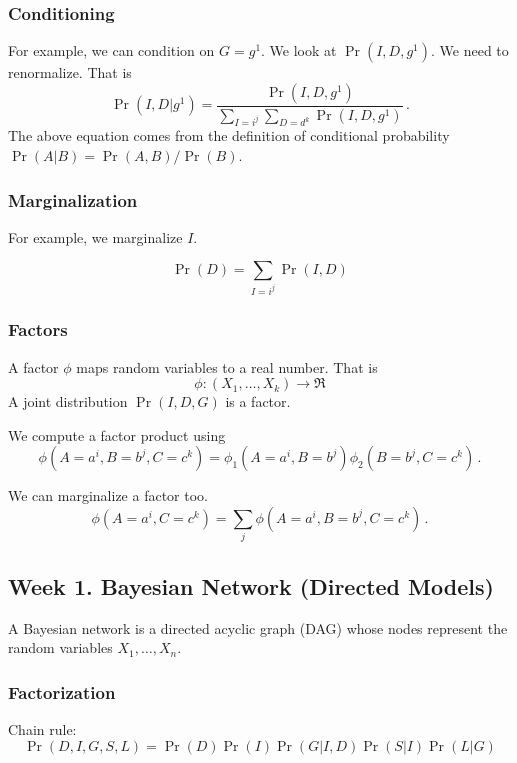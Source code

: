 \documentclass[12pt]{article}
\begin{document}
\subsubsection{Conditioning}
For example, we can condition on $G=g^1$.  We look at $\Pr(I, D, g^1)$.
We need to renormalize. That is
\begin{equation*}
  \Pr(I, D | g^1) = \frac{\Pr(I, D, g^1)}
                         {\sum_{I=i^j} \sum_{D=d^k} \Pr(I, D, g^1)}  \, .
\end{equation*}
The above equation comes from the definition of conditional probability $\Pr(A | B) = \Pr(A, B) / \Pr(B)$.

\subsubsection{Marginalization}
For example, we marginalize $I$.

\begin{equation*}
  \Pr(D) = \sum_{I=i^j} \Pr(I, D)
\end{equation*}


\subsubsection{Factors}
A factor $\phi$ maps random variables to a real number. That is
\begin{equation*}
  \phi : (X_1, \ldots, X_k) \rightarrow \Re
\end{equation*}
A joint distribution $\Pr(I, D, G)$ is a factor.

We compute a factor product using
\begin{equation*}
  \phi(A=a^i, B=b^j, C=c^k) = \phi_1(A=a^i, B=b^j) \phi_2(B=b^j, C=c^k) \, .
\end{equation*}

We can marginalize a factor too.
\begin{equation*}
  \phi(A=a^i, C=c^k) = \sum_j \phi(A=a^i, B=b^j, C=c^k) \,.
\end{equation*}




\subsection{Week 1. Bayesian Network (Directed Models)}

A Bayesian network is a directed acyclic graph (DAG) whose nodes represent the random variables $X_1, \ldots, X_n$.
\subsubsection{Factorization}
Chain rule:
\begin{equation}
  \Pr(D, I, G, S, L) = \Pr(D) \Pr(I) \Pr(G|I, D) \Pr(S|I) \Pr(L|G)
\end{equation}
\end{document}
